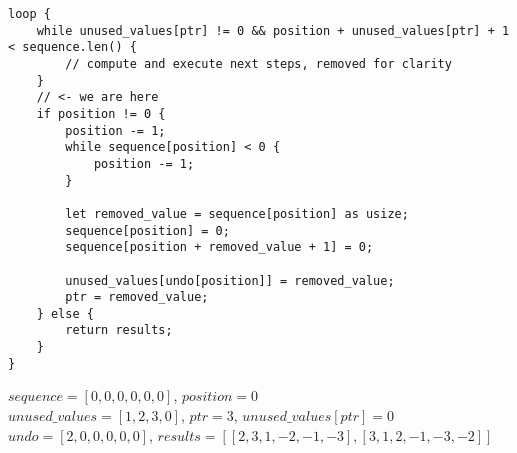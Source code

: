 \begin{frame}[fragile]
    \begin{verbatim}
loop {
    while unused_values[ptr] != 0 && position + unused_values[ptr] + 1 < sequence.len() {
        // compute and execute next steps, removed for clarity
    }
    // <- we are here
    if position != 0 {
        position -= 1;
        while sequence[position] < 0 {
            position -= 1;
        }
        
        let removed_value = sequence[position] as usize;
        sequence[position] = 0;
        sequence[position + removed_value + 1] = 0;
        
        unused_values[undo[position]] = removed_value;
        ptr = removed_value;
    } else {
        return results;
    }
}
    \end{verbatim}
    $sequence = [0, 0, 0, 0, 0, 0]$, $position = 0$\\
    $unused\_values = [1, 2, 3, 0]$, $ptr = 3$, $unused\_values[ptr] = 0$\\
    $undo = [2, 0, 0, 0, 0, 0]$, $results = [[2, 3, 1, -2, -1, -3], [3, 1, 2, -1, -3, -2]]$
\end{frame}